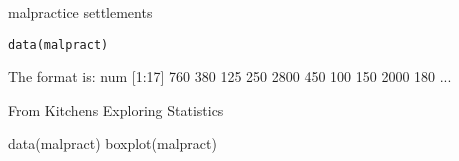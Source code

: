 \begin{Description}\relax
malpractice settlements
\end{Description}
\begin{Usage}
\begin{verbatim}data(malpract)\end{verbatim}
\end{Usage}
\begin{Format}\relax
The format is:
num [1:17] 760 380 125 250 2800 450 100 150 2000 180 ...
\end{Format}
\begin{Source}\relax
From Kitchens Exploring Statistics
\end{Source}
\begin{Examples}
\begin{ExampleCode}
data(malpract)
boxplot(malpract)
\end{ExampleCode}
\end{Examples}

